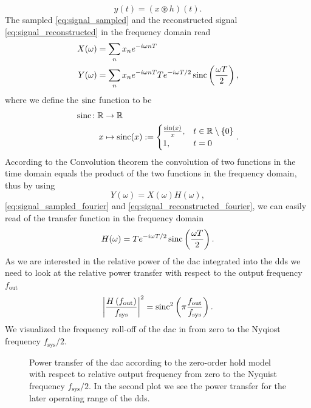 \begin{equation}
  y(t)
  =
  \left(x\circledast h\right)(t).
  \label{eq:signal_transfer}
\end{equation}
The sampled \cref{eq:signal_sampled} and the reconstructed signal
\cref{eq:signal_reconstructed} in the frequency domain read
\begin{align}
  X(\omega)&=\sum_n x_n e^{-i\omega n T}
  \label{eq:signal_sampled_fourier}\\
  Y(\omega)&=\sum_n x_n e^{-i\omega n T}
  Te^{-i\omega T/2}\operatorname{sinc}\left(\frac{\omega T}{2}\right)
  \label{eq:signal_reconstructed_fourier},
\end{align}
where we define the $\operatorname{sinc}$ function to be
\begin{align}
  \operatorname{sinc}\colon\mathbb{R} &\to \mathbb{R}\\
  x &\mapsto \operatorname{sinc}(x):=
  \begin{cases}
    \frac{\sin(x)}{x}, & t\in\mathbb{R}\setminus\{0\}\\
    1, & t=0
  \end{cases}
  \label{eq:sinc}.
\end{align}
According to the Convolution theorem the convolution of two functions in the
time domain equals the product of the two functions in the frequency domain,
thus by using
\begin{equation}
  Y(\omega)
  =X(\omega)H(\omega)
  \label{eq:transfer_fourier},
\end{equation}
\cref{eq:signal_sampled_fourier} and \cref{eq:signal_reconstructed_fourier},
we can easily read of the transfer function in the frequency domain
\begin{equation}
  H(\omega)
  =Te^{-i\omega T/2}\operatorname{sinc}\left(\frac{\omega T}{2}\right).
\end{equation}
As we are interested in the relative power of the \gls{dac} integrated into
the \gls{dds} we need to look at the relative power transfer with respect to
the output frequency $f_\text{out}$
\begin{equation}
  \abs{\frac{H\left(f_\text{out}\right)}{f_\text{sys}}}^2
  =\operatorname{sinc}^2\left(\pi\frac{f_\text{out}}{f_\text{sys}}\right).
\end{equation}
We visualized the frequency roll-off of the \gls{dac} in
 from zero to the Nyqiost frequency
$f_\text{sys}/2$.
\begin{figure}[htb]
  \centering
  \begin{adjustbox}{width=\textwidth}
    
  \end{adjustbox}
  \caption{Power transfer of the \gls{dac} according to the zero-order hold
    model with respect to relative output frequency from zero to the Nyquist
    frequency $f_\text{sys}/2$. In the second plot we see the power transfer
    for the later operating range of the \gls{dds}.
  }\label{fig:dds_dac_response}
\end{figure}
